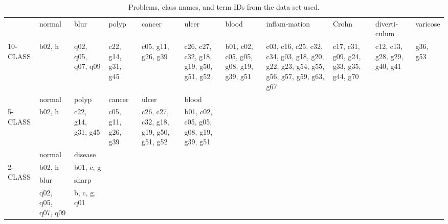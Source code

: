 \documentclass[preprint]{article}
\begin{document}
\begin{longtable}{p{1.5cm}|p{0.9cm}|p{0.9cm}|p{0.7cm}p{0.7cm}p{0.7cm}p{0.7cm}p{1.1cm}p{0.7cm}p{0.75cm}p{0.7cm}}
\caption{Problems, class names, and term IDs from the data set used.} \\

&normal&blur&polyp&cancer&ulcer&blood&inflam-mation& Crohn &diverti-culum&varicose\\
\cline{2-11}
\multirow{2}{*}{10-CLASS}&b02, h&
q02, q05, q07, q09&
c22, g14, g31, g45&
c05, g11, g26, g39&
c26, c27, c32, g18, g19, g50, g51, g52&
b01, c02, c05, g05, g08, g19, g39, g51&
c03, c16, c25, c32, c34, g03, g18, g20, g22, g23, g54, g55, g56, g57, g59, g63, g67&
c17, c31, g09, g24, g33, g35, g44, g70&
c12, c13, g28, g29, g40, g41&
g36, g53\\
\hline
&
normal&
polyp&
cancer&
ulcer&
blood&&&&& \\
\cline{2-6}
\multirow{2}{*}{5-CLASS}&b02, h&
c22, g14, g31, g45&
c05, g11, g26, g39&
c26, c27, c32, g18, g19, g50, g51, g52&
b01, c02, c05, g05, g08, g19, g39, g51&&&&& \\
\cline{1-6}

&normal
&disease& & & & & & & & \\
\cline{2-3}
\multirow{2}{*}{2-CLASS}&b02, h&
b01, c, g& & & & & & & & \\
\cline{1-3}
\multirow{2}{*}{BLUR}&
blur&
sharp& & & & & & & & \\
\cline{2-3}
&
q02, q05, q07, q09&
b, c, g, q01& & & & & & & & \\
\cline{1-3}
\end{longtable}







\end{document}
